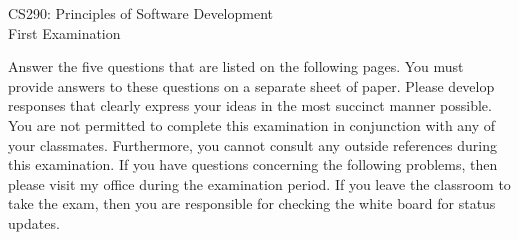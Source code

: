 \documentclass[12pt,epsf,psfig,graphics]{article}
\def\widow#1{\vskip #1\vbadness10000\penalty-200\vskip-#1}
\begin{document}
\def\widow#1{\vskip #1\vbadness10000\penalty-200\vskip-#1}

\begin{center}

CS290: Principles of Software Development \\
First Examination \\

\end{center}

\noindent
Answer the five questions that are listed on the following pages.  You
must provide answers to these questions on a separate sheet of paper.
Please develop responses that clearly express your ideas in the most
succinct manner possible.  You are not permitted to complete this
examination in conjunction with any of your classmates.  Furthermore,
you cannot consult any outside references during this examination.  If
you have questions concerning the following problems, then please
visit my office during the examination period.  If you leave the
classroom to take the exam, then you are responsible for checking the
white board for status updates.

\end{document}
